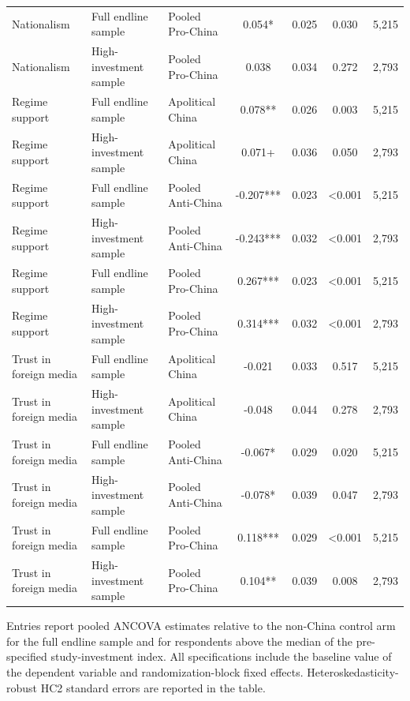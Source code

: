 \begin{table}[H]
\begin{threeparttable}
\begin{tabular}{lllcccc}
Nationalism & Full endline sample & Pooled Pro-China & 0.054* & 0.025 & 0.030 & 5,215 \\
Nationalism & High-investment sample & Pooled Pro-China & 0.038 & 0.034 & 0.272 & 2,793 \\
Regime support & Full endline sample & Apolitical China & 0.078** & 0.026 & 0.003 & 5,215 \\
Regime support & High-investment sample & Apolitical China & 0.071+ & 0.036 & 0.050 & 2,793 \\
Regime support & Full endline sample & Pooled Anti-China & -0.207*** & 0.023 & <0.001 & 5,215 \\
Regime support & High-investment sample & Pooled Anti-China & -0.243*** & 0.032 & <0.001 & 2,793 \\
Regime support & Full endline sample & Pooled Pro-China & 0.267*** & 0.023 & <0.001 & 5,215 \\
Regime support & High-investment sample & Pooled Pro-China & 0.314*** & 0.032 & <0.001 & 2,793 \\
Trust in foreign media & Full endline sample & Apolitical China & -0.021 & 0.033 & 0.517 & 5,215 \\
Trust in foreign media & High-investment sample & Apolitical China & -0.048 & 0.044 & 0.278 & 2,793 \\
Trust in foreign media & Full endline sample & Pooled Anti-China & -0.067* & 0.029 & 0.020 & 5,215 \\
Trust in foreign media & High-investment sample & Pooled Anti-China & -0.078* & 0.039 & 0.047 & 2,793 \\
Trust in foreign media & Full endline sample & Pooled Pro-China & 0.118*** & 0.029 & <0.001 & 5,215 \\
Trust in foreign media & High-investment sample & Pooled Pro-China & 0.104** & 0.039 & 0.008 & 2,793 \\
\bottomrule
\end{tabular}
\begin{tablenotes}[flushleft]
\footnotesize
\item Entries report pooled ANCOVA estimates relative to the non-China control arm for the full endline sample and for respondents above the median of the pre-specified study-investment index. All specifications include the baseline value of the dependent variable and randomization-block fixed effects. Heteroskedasticity-robust HC2 standard errors are reported in the table.
\end{tablenotes}
\end{threeparttable}
\end{table}
